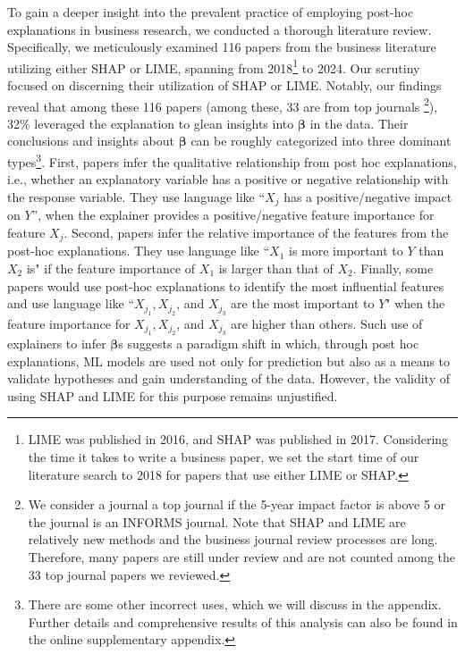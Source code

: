 \documentclass[mnsc,blindrev]{informs3}
\begin{document}
To gain a deeper insight into the prevalent practice of employing post-hoc explanations in business research, we conducted a thorough literature review. Specifically, we meticulously examined 116 papers from the business literature utilizing either SHAP or LIME, spanning from 2018\footnote{LIME was published in 2016, and SHAP was published in 2017. Considering the time it takes to write a business paper, we set the start time of our literature search to 2018 for papers that use either LIME or SHAP.} to 2024. Our scrutiny focused on discerning their utilization of SHAP or LIME. Notably, our findings reveal that among these 116 papers (among these, 33 are from top journals \footnote{We consider a journal a top journal if the 5-year impact factor is above 5 or the journal is an INFORMS journal. Note that SHAP and LIME are relatively new methods and the business journal review processes are long. Therefore, many papers are still under review and are not counted among the 33 top journal papers we reviewed.}), 32\% leveraged the explanation to glean insights into $\boldsymbol{\beta}$ in the data. Their conclusions and insights about $\boldsymbol{\beta}$ can be roughly categorized into three dominant types\footnote{There are some other incorrect uses, which we will discuss in the appendix. Further details and comprehensive results of this analysis can also be found in the online supplementary  appendix.}. First, papers infer the qualitative relationship from post hoc explanations, i.e., whether an explanatory variable has a positive or negative relationship with the response variable. They use language like ``$X_j$ has a positive/negative impact on $Y$'', when the explainer provides a positive/negative feature importance for feature $X_j$. Second, papers infer the relative importance of the features from the post-hoc explanations. They use language like ``$X_1$ is more important to $Y$ than $X_2$ is" if the feature importance of $X_1$ is larger than that of $X_2$. Finally, some papers would use post-hoc explanations to identify the most influential features and use language like ``$X_{j_1}, X_{j_2}$, and $X_{j_3}$ are the most important to $Y$" when the feature importance for $X_{j_1}, X_{j_2}$, and $X_{j_3}$ are higher than others. 
Such use of explainers to infer $\boldsymbol{\beta}$s suggests a paradigm shift in which, through post hoc explanations, ML models are used not only for prediction but also as a means to validate hypotheses and gain understanding of the data. However, the validity of using SHAP and LIME for this purpose remains unjustified. 
\end{document}
